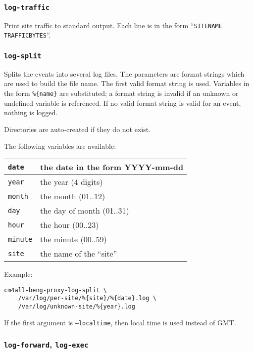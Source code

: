\documentclass[a4paper,12pt]{article}
\begin{document}
\subsubsection{\texttt{log-traffic}}

Print site traffic to standard output.  Each line is in the form
``\texttt{SITENAME TRAFFICBYTES}''.

\subsubsection{\texttt{log-split}}

Splits the events into several log files.  The parameters are format
strings which are used to build the file name.  The first valid format
string is used.  Variables in the form \texttt{\%\{name\}} are
substituted; a format string is invalid if an unknown or undefined
variable is referenced.  If no valid format string is valid for an
event, nothing is logged.

Directories are auto-created if they do not exist.

The following variables are available:

\smallskip
\noindent\begin{tabu} {|l|X|}
\hline
\texttt{date} & the date in the form YYYY-mm-dd \\
\hline
\texttt{year} & the year (4 digits) \\
\hline
\texttt{month} & the month (01..12) \\
\hline
\texttt{day} & the day of month (01..31) \\
\hline
\texttt{hour} & the hour (00..23) \\
\hline
\texttt{minute} & the minute (00..59) \\
\hline
\texttt{site} & the name of the ``site'' \\
\hline
\end{tabu}
\smallskip

Example:

\begin{verbatim}
cm4all-beng-proxy-log-split \
    /var/log/per-site/%{site}/%{date}.log \
    /var/log/unknown-site/%{year}.log
\end{verbatim}

If the first argument is \texttt{--localtime}, then local time is used
instead of GMT.

\subsubsection{\texttt{log-forward}, \texttt{log-exec}}
\end{document}
